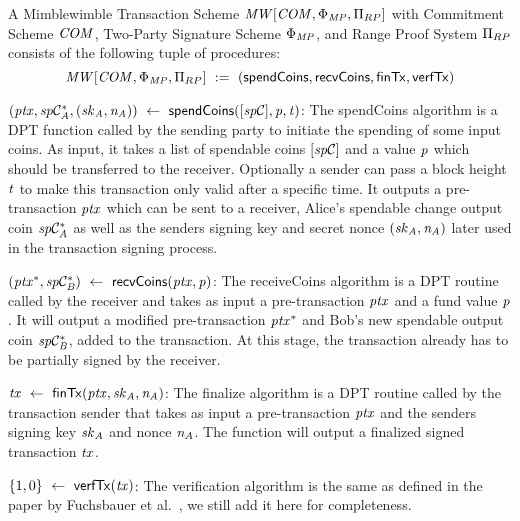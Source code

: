 \begin{definition}
    \label{def:atom:mw-tx-scheme}
    A Mimblewimble Transaction Scheme $\mathit{MW}[\mathit{COM},\Phi_{\mathit{MP}},\Pi_{RP}]$ with Commitment Scheme $\mathit{COM}$, Two-Party Signature Scheme $\Phi_{\mathit{MP}}$, and Range Proof System $\Pi_{RP}$ consists of the following tuple of procedures:
    \[ \mathit{MW}[\mathit{COM},\Phi_{\mathit{MP}},\Pi_{RP}] ~:=~ ( \mathsf{spendCoins},\mathsf{recvCoins},\mathsf{finTx},\mathsf{verfTx} ) \]
    \begin{asparaitem}
        \item $(\mathit{ptx}, \mathit{sp}\mathcal{C}_{\mathit{A}}^*, (\mathit{sk}_{\mathit{A}}, \mathit{\mathit{n}_{\mathit{A}}})) ~\leftarrow~ \mathsf{spendCoins}([\mathit{sp}\mathcal{C}],\mathit{p},\mathit{t})$: The spendCoins algorithm is a DPT function called by the sending party to initiate the spending of some input coins.
        As input, it takes a list of spendable coins $[\mathit{sp}\mathcal{C}]$ and a value $\mathit{p}$ which should be transferred to the receiver.
        Optionally a sender can pass a block height $\mathit{t}$ to make this transaction only valid after a specific time.
        It outputs a pre-transaction $\mathit{ptx}$ which can be sent to a receiver, Alice's spendable change output coin $\mathit{sp}\mathcal{C}_{\mathit{A}}^*$ as well as the senders signing key and secret nonce $(\mathit{sk}_{\mathit{A}}, \mathit{\mathit{n}_{\mathit{A}}})$ later used in the transaction signing process.
        \item $(\mathit{ptx}^*, \mathit{sp}\mathcal{C}_{\mathit{B}}^*) ~\leftarrow~ \mathsf{recvCoins}(\mathit{ptx},\mathit{p})$: The receiveCoins algorithm is a DPT routine called by the receiver and takes as input a pre-transaction $\mathit{ptx}$ and a fund value
        $\mathit{p}$.
        It will output a modified pre-transaction $\mathit{ptx}^*$ and Bob's new spendable output coin $\mathit{sp}\mathcal{C}_{\mathit{B}}^*$, added to the transaction.
        At this stage, the transaction already has to be partially signed by the receiver.
        \item $\mathit{tx} ~\leftarrow~ \mathsf{finTx}(\mathit{ptx},\mathit{sk}_{\mathit{A}},\mathit{\mathit{n}_{\mathit{A}}})$: The finalize algorithm is a DPT routine called by the transaction sender that takes as input a pre-transaction $\mathit{ptx}$ and the senders signing key $\mathit{sk}_{\mathit{A}}$ and nonce $\mathit{\mathit{n}_{\mathit{A}}}$.
        The function will output a finalized signed transaction $\mathit{tx}$.
        \item $\{1,0\} ~\leftarrow~ \mathsf{verfTx}(\mathit{tx})$: The verification algorithm is the same as defined in the paper by Fuchsbauer et al.~\cite{fuchsbauer2019aggregate}, we still add it here for completeness.

\end{asparaitem}
\end{definition}
